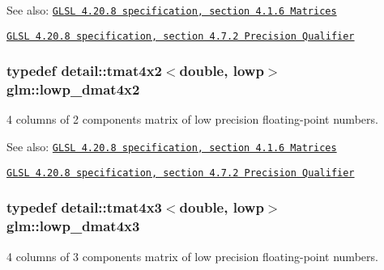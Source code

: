 \begin{Desc}
\item[See also:]\href{http://www.opengl.org/registry/doc/GLSLangSpec.4.20.8.pdf}{\tt GLSL 4.20.8 specification, section 4.1.6 Matrices} 

\href{http://www.opengl.org/registry/doc/GLSLangSpec.4.20.8.pdf}{\tt GLSL 4.20.8 specification, section 4.7.2 Precision Qualifier} \end{Desc}
\hypertarget{group__core__precision_g28a7ef670069c3707f19b9de1039517e}{
\subsubsection[lowp\_\-dmat4x2]{\setlength{\rightskip}{0pt plus 5cm}typedef detail::tmat4x2$<$double, lowp$>$ {\bf glm::lowp\_\-dmat4x2}}}
\label{group__core__precision_g28a7ef670069c3707f19b9de1039517e}


4 columns of 2 components matrix of low precision floating-point numbers.

\begin{Desc}
\item[See also:]\href{http://www.opengl.org/registry/doc/GLSLangSpec.4.20.8.pdf}{\tt GLSL 4.20.8 specification, section 4.1.6 Matrices} 

\href{http://www.opengl.org/registry/doc/GLSLangSpec.4.20.8.pdf}{\tt GLSL 4.20.8 specification, section 4.7.2 Precision Qualifier} \end{Desc}
\hypertarget{group__core__precision_gbc1be51eb0cae7cd4b1d6483a954c35d}{
\subsubsection[lowp\_\-dmat4x3]{\setlength{\rightskip}{0pt plus 5cm}typedef detail::tmat4x3$<$double, lowp$>$ {\bf glm::lowp\_\-dmat4x3}}}
\label{group__core__precision_gbc1be51eb0cae7cd4b1d6483a954c35d}


4 columns of 3 components matrix of low precision floating-point numbers.

